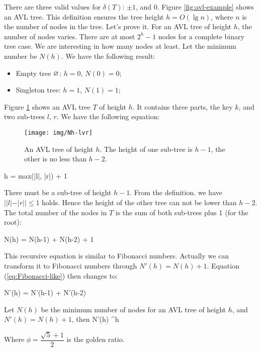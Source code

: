 \documentclass[b5paper]{article}
\begin{document}
There are three valid values for $\delta(T)$: $\pm 1$, and 0. Figure \ref{fig:avl-example} shows an AVL tree. This definition ensures the tree height $h = O(\lg n)$, where $n$ is the number of nodes in the tree. Let's prove it. For an AVL tree of height $h$, the number of nodes varies. There are at most $2^h - 1$ nodes for a complete binary tree case. We are interesting in how many nodes at least. Let the minimum number be $N(h)$. We have the following result:

\begin{itemize}
\item Empty tree $\varnothing$: $h = 0$, $N(0) = 0$;
\item Singleton tree: $h = 1$, $N(1) = 1$;
\end{itemize}

Figure \ref{fig:N-h-relation} shows an AVL tree $T$ of height $h$. It contains three parts, the key $k$, and two sub-trees $l$, $r$. We have the following equation:

\begin{figure}[htbp]
   \centering
   \texttt{[image: img/Nh-lvr]}
   \caption{An AVL tree of height $h$. The height of one sub-tree is $h-1$, the other is no less than $h-2$.}
   \label{fig:N-h-relation}
\end{figure}

\be
  h = max(|l|, |r|) + 1
\ee

There must be a sub-tree of height $h - 1$. From the definition. we have $||l|-|r|| \leq 1$ holds. Hence the height of the other tree can not be lower than $h - 2$. The total number of the nodes in $T$ is the sum of both sub-trees plus 1 (for the root):

\be
  N(h) = N(h-1) + N(h-2) + 1
  \label{eq:Fibonacci-like}
\ee

This recursive equation is similar to Fibonacci numbers. Actually we can transform it to Fibonacci numbers through $N'(h) = N(h) + 1$. Equation (\ref{eq:Fibonacci-like}) then changes to:

\be
  N'(h) = N'(h-1) + N'(h-2)
\ee

\begin{lemma}
\label{lemma:N-phi}
Let $N(h)$ be the minimum number of nodes for an AVL tree of height $h$, and $N'(h) = N(h) + 1$, then
\be
  N'(h) \geq \phi^h
\ee

Where $\phi = \dfrac{\sqrt{5}+1}{2}$ is the golden ratio.
\end{lemma}
\end{document}
